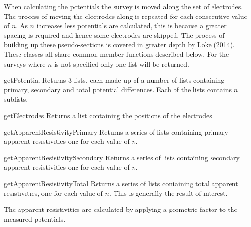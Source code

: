 When calculating the potentials the survey is moved along the set of electrodes.
The process of moving the electrodes along is repeated for each consecutive value of $n$.
As $n$ increases less potentials are calculated, this is because a greater spacing is
required and hence some electrodes are skipped. The process of building up these
pseudo-sections is covered in greater depth by Loke (2014)\cite[pg 19]{LOKE2014}.
These classes all share common member functions described below. For the surveys
where $n$ is not specified only one list will be returned. 

\begin{methoddesc}[]{getPotential}{}
Returns 3 lists, each made up of a number of lists containing primary, secondary and total
potential differences. Each of the lists contains $n$ sublists.
\end{methoddesc}

\begin{methoddesc}[]{getElectrodes}{}
Returns a list containing the positions of the electrodes
\end{methoddesc}

\begin{methoddesc}[]{getApparentResistivityPrimary}{}
Returns a series of lists containing primary apparent resistivities one for each 
value of $n$.
\end{methoddesc}

\begin{methoddesc}[]{getApparentResistivitySecondary}{}
Returns a series of lists containing secondary apparent resistivities one for each 
value of $n$.
\end{methoddesc}

\begin{methoddesc}[]{getApparentResistivityTotal}{}
Returns a series of lists containing total apparent resistivities, one for each 
value of $n$. This is generally the result of interest.
\end{methoddesc}

The apparent resistivities are calculated by applying a geometric factor to the
measured potentials.

